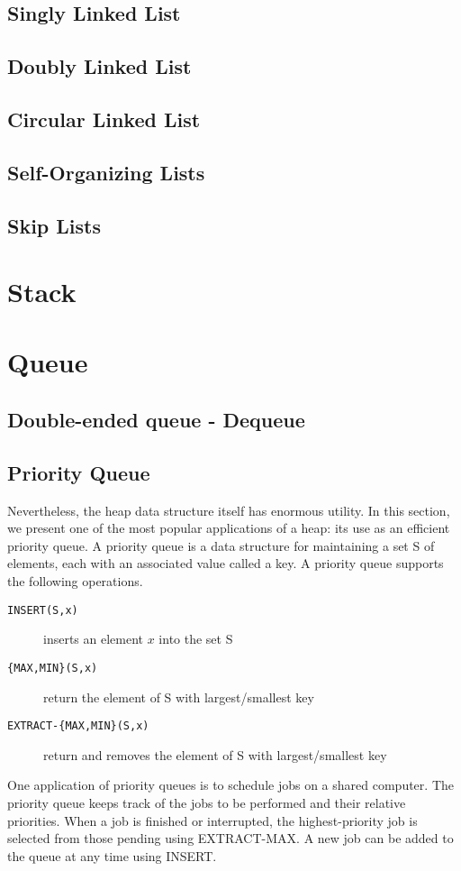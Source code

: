 \section{Singly Linked List}
\section{Doubly Linked List}
\section{Circular Linked List}
\section{Self-Organizing Lists}
\section{Skip Lists}

\chapter{Stack}

\chapter{Queue}
\section{Double-ended queue - Dequeue}

\section{Priority Queue}
Nevertheless, the heap data structure itself has enormous utility. In this section, we present one of the most popular applications of a heap: its use as an efficient priority queue.
A priority queue is a data structure for maintaining a set S of elements, each with an associated value called a key. A priority queue supports the following operations.
\begin{description}
\item [\texttt{INSERT(S,x)}] inserts an element $x$ into the set S
\item [\texttt{\{MAX,MIN\}(S,x)}] return the element of S with largest/smallest key 
\item [\texttt{EXTRACT-\{MAX,MIN\}(S,x)}] return and removes the element of S with largest/smallest key 
\end{description}
One application of priority queues is to schedule jobs on a shared computer. The priority queue keeps track of the jobs to be performed and their relative priorities. When a job is finished or interrupted, the highest-priority job is selected from those pending using EXTRACT-MAX. A new job can be added to the queue at any time using INSERT.

